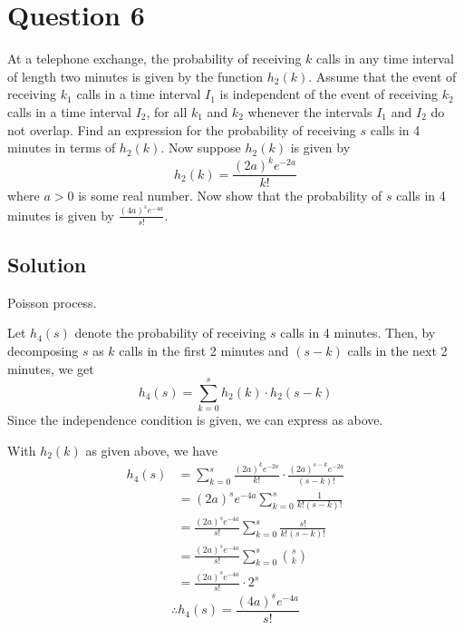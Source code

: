 \section*{Question 6}

At a telephone exchange, the probability of receiving \(k\) calls in any time interval of length two minutes is given by the function \(h_2(k)\).
Assume that the event of receiving \(k_1\) calls in a time interval \(I_1\) is independent of the event of receiving \(k_2\) calls in a time interval \(I_2\), for all \(k_1\) and \(k_2\) whenever the intervals \(I_1\) and \(I_2\) do not overlap.
Find an expression for the probability of receiving \(s\) calls in 4 minutes in terms of \(h_2(k)\).
Now suppose \(h_2(k)\) is given by
\[
    h_2(k) = \frac{{(2a)}^k e^{-2a}}{k!}
\]
where \(a > 0\) is some real number.
Now show that the probability of \(s\) calls in 4 minutes is given by \( \frac{(4a)^s e^{-4a}}{s!} \).

\subsection*{Solution}

Poisson process.

Let \( h_4(s) \) denote the probability of receiving \( s \) calls in 4 minutes.
Then, by decomposing \( s \) as \( k \) calls in the first 2 minutes and \( (s-k) \) calls in the next 2 minutes, we get
\begin{equation*}
    \boxed{
        h_4(s) = \sum_{k=0}^{s} h_2(k) \cdot h_2(s-k)
    }
\end{equation*}
Since the independence condition is given, we can express as above.

With \( h_2(k) \) as given above, we have
\begin{align*}
    h_4(s)
     & =
    \sum_{k=0}^{s} \frac{{(2a)}^k e^{-2a}}{k!} \cdot \frac{{(2a)}^{s-k} e^{-2a}}{(s-k)!}
    \\ & =
    {(2a)}^s e^{-4a} \sum_{k=0}^{s} \frac{1}{k! (s-k)!}
    \\ & =
    \frac{{(2a)}^s e^{-4a}}{s!} \sum_{k=0}^{s} \frac{s!}{k! (s-k)!}
    \\ & =
    \frac{{(2a)}^s e^{-4a}}{s!} \sum_{k=0}^{s} \binom{s}{k}
    \\ & =
    \frac{{(2a)}^s e^{-4a}}{s!} \cdot 2^s
\end{align*}
\begin{equation*}
    \therefore
    \boxed{
        h_4(s) = \frac{{(4a)}^s e^{-4a}}{s!}
    }
\end{equation*}
